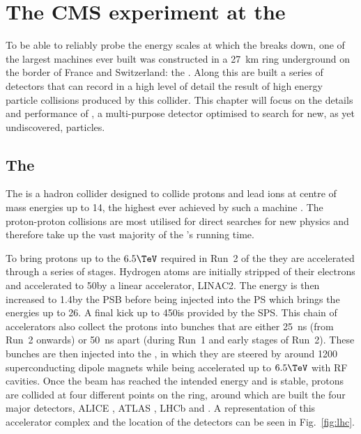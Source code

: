 \chapter{The CMS experiment at the \LHC}
\label{chap:detector}


To be able to reliably probe the energy scales at which the \SM breaks
down, one of the largest machines ever built was constructed in a
27~km ring underground on the border of France and Switzerland: the
\LHC. Along this are built a series of detectors that can record in a high
level of detail the result of high energy particle collisions produced
by this collider. This chapter will focus on the details and
performance of \CMS, a multi-purpose detector optimised to search for
new, as yet undiscovered, particles.

\section{The \LHC}
\label{sec:lhc}

The \LHC is a hadron collider designed to collide protons and lead
ions at centre of mass energies up to 14\tev, the highest ever achieved by such a
machine
\cite{Evans:2008zzb,CERN-2004-003-V-1,CERN-2004-003-V-2,CERN-2004-003-V-3}.
The proton-proton collisions are most utilised for direct searches for
new physics and therefore take up the vast majority of the \LHC's
running time. 

To bring protons up to the $6.5\tev$ required in Run~2 of the \LHC they are
accelerated through a series of stages. Hydrogen atoms are initially stripped
of their electrons and accelerated to 50\mev by a linear accelerator,
\ac{LINAC2}. The energy is then increased to 1.4\gev by the \ac{PSB} before
being injected into the \ac{PS} which brings the energies up to 26\gev. A final
kick up to 450\gev is provided by the \ac{SPS}. This chain of accelerators also
collect the protons into bunches that are either 25~ns (from Run~2 onwards) or
50~ns apart (during Run~1 and early stages of Run~2). These bunches are then
injected into the \LHC, in which they are steered by around 1200
superconducting dipole magnets while being accelerated up to $6.5\tev$ with
\ac{RF} cavities. Once the beam has reached the intended energy and is stable,
protons are collided at four different points on the ring, around which are
built the four major \LHC detectors, ALICE \cite{Aamodt:2008zz}, ATLAS
\cite{Aad:2008zzm}, LHCb \cite{Alves:2008zz} and \CMS \cite{Chatrchyan:2008aa}.
A representation of this accelerator complex and the location of the
detectors can be seen in Fig.~\ref{fig:lhc}.

